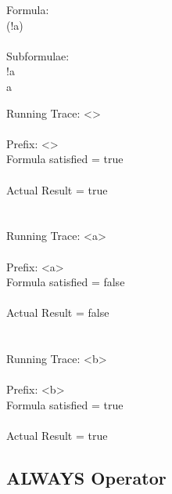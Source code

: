 Formula:\\
(!a)\\
\\
Subformulae:\\
!a\\
a\\

\newpage

\noindent Running Trace: \textless \textgreater\\
\\
  Prefix: \textless \textgreater\\
  Formula satisfied = true\\
\\
  Actual Result = true\\
\\
\\
Running Trace: \textless a\textgreater\\
\\
  Prefix: \textless a\textgreater\\
  Formula satisfied = false\\
\\
  Actual Result = false\\
\\
\\
Running Trace: \textless b\textgreater\\
\\
  Prefix: \textless b\textgreater\\
  Formula satisfied = true\\
\\
  Actual Result = true\\

\subsection{ALWAYS Operator}


